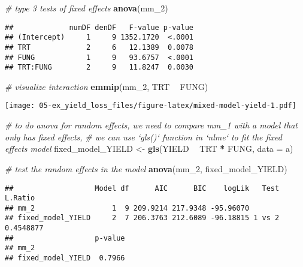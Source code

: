 \documentclass[]{book}
\newenvironment{Shaded}{\begin{snugshade}}{\end{snugshade}}
\newcommand{\CommentTok}[1]{\textcolor[rgb]{0.56,0.35,0.01}{\textit{#1}}}
\newcommand{\DataTypeTok}[1]{\textcolor[rgb]{0.13,0.29,0.53}{#1}}
\newcommand{\DecValTok}[1]{\textcolor[rgb]{0.00,0.00,0.81}{#1}}
\newcommand{\KeywordTok}[1]{\textcolor[rgb]{0.13,0.29,0.53}{\textbf{#1}}}
\newcommand{\NormalTok}[1]{#1}
\newcommand{\OperatorTok}[1]{\textcolor[rgb]{0.81,0.36,0.00}{\textbf{#1}}}
\newcommand{\StringTok}[1]{\textcolor[rgb]{0.31,0.60,0.02}{#1}}
\begin{document}
\begin{Shaded}
\begin{Highlighting}[]
\CommentTok{# type 3 tests of fixed effects}
\KeywordTok{anova}\NormalTok{(mm_}\DecValTok{2}\NormalTok{)}
\end{Highlighting}
\end{Shaded}

\begin{verbatim}
##             numDF denDF   F-value p-value
## (Intercept)     1     9 1352.1720  <.0001
## TRT             2     6   12.1389  0.0078
## FUNG            1     9   93.6757  <.0001
## TRT:FUNG        2     9   11.8247  0.0030
\end{verbatim}

\begin{Shaded}
\begin{Highlighting}[]
\CommentTok{# visualize interaction}
\KeywordTok{emmip}\NormalTok{(mm_}\DecValTok{2}\NormalTok{, TRT }\OperatorTok{~}\StringTok{ }\NormalTok{FUNG)}
\end{Highlighting}
\end{Shaded}

\texttt{[image: 05-ex\_yield\_loss\_files/figure-latex/mixed-model-yield-1.pdf]}

\begin{Shaded}
\begin{Highlighting}[]
\CommentTok{# to do anova for random effects, we need to compare mm_1 with a model that only has fixed effects,}
\CommentTok{# we can use `gls()` function in `nlme` to fit the fixed effects model}
\NormalTok{fixed_model_YIELD <-}\StringTok{ }\KeywordTok{gls}\NormalTok{(YIELD }\OperatorTok{~}\StringTok{ }\NormalTok{TRT }\OperatorTok{*}\StringTok{ }\NormalTok{FUNG,}
                                     \DataTypeTok{data =}\NormalTok{ a)}

\CommentTok{# test the random effects in the model}
\KeywordTok{anova}\NormalTok{(mm_}\DecValTok{2}\NormalTok{, fixed_model_YIELD)}
\end{Highlighting}
\end{Shaded}

\begin{verbatim}
##                   Model df      AIC      BIC    logLik   Test   L.Ratio
## mm_2                  1  9 209.9214 217.9348 -95.96070                 
## fixed_model_YIELD     2  7 206.3763 212.6089 -96.18815 1 vs 2 0.4548877
##                   p-value
## mm_2                     
## fixed_model_YIELD  0.7966
\end{verbatim}
\end{document}

